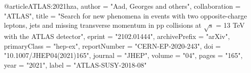@article{ATLAS:2021hza,
    author = "Aad, Georges and others",
    collaboration = "ATLAS",
    title = "{Search for new phenomena in events with two opposite-charge leptons, jets and missing transverse momentum in pp collisions at $ \sqrt{\mathrm{s}} $ = 13 TeV with the ATLAS detector}",
    eprint = "2102.01444",
    archivePrefix = "arXiv",
    primaryClass = "hep-ex",
    reportNumber = "CERN-EP-2020-243",
    doi = "10.1007/JHEP04(2021)165",
    journal = "JHEP",
    volume = "04",
    pages = "165",
    year = "2021",
    label = "ATLAS-SUSY-2018-08"
}

